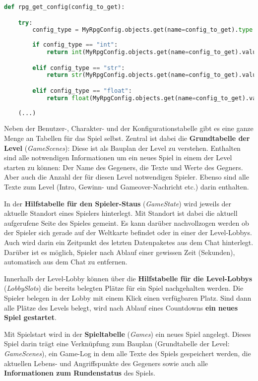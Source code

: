 \begin{lstlisting}[language=python]
def rpg_get_config(config_to_get):

    try: 
        config_type = MyRpgConfig.objects.get(name=config_to_get).type
    
        if config_type == "int":
            return int(MyRpgConfig.objects.get(name=config_to_get).value)

        elif config_type == "str":
            return str(MyRpgConfig.objects.get(name=config_to_get).value)

        elif config_type == "float":
            return float(MyRpgConfig.objects.get(name=config_to_get).value)
    
    (...)
\end{lstlisting}


Neben der Benutzer-, Charakter- und der Konfigurationstabelle gibt es eine ganze Menge an Tabellen für das Spiel selbst. Zentral ist dabei die \textbf{Grundtabelle der Level} (\textit{GameScenes}): Diese ist als Bauplan der Level zu verstehen. Enthalten sind alle notwendigen Informationen um ein neues Spiel in einem der Level starten zu können: Der Name des Gegeners, die Texte und Werte des Gegners. Aber auch die Anzahl der für diesen Level notwendigen Spieler. Ebenso sind alle Texte zum Level (Intro, Gewinn- und Gameover-Nachricht etc.) darin enthalten. 

In der \textbf{Hilfstabelle für den Spieler-Staus} (\textit{GameState}) wird jeweils der aktuelle Standort eines Spielers hinterlegt. Mit Standort ist dabei die aktuell aufgerufene Seite des Spieles gemeint. Es kann darüber nachvollzogen werden ob der Spieler sich gerade auf der Weltkarte befindet oder in einer der Level-Lobbys. Auch wird darin ein Zeitpunkt des letzten Datenpaketes aus dem Chat hinterlegt. Darüber ist es möglich, Spieler nach Ablauf einer gewissen Zeit (Sekunden), automatisch aus dem Chat zu entfernen. 

Innerhalb der Level-Lobby können über die \textbf{Hilfstabelle für die Level-Lobbys} (\textit{LobbySlots}) die bereits belegten Plätze für ein Spiel nachgehalten werden. Die Spieler belegen in der Lobby mit einem Klick einen verfügbaren Platz. Sind dann alle Plätze des Levels belegt, wird nach Ablauf eines Countdowns \textbf{ein neues Spiel gestartet}.

Mit Spielstart wird in der \textbf{Spieltabelle} (\textit{Games}) ein neues Spiel angelegt. Dieses Spiel darin trägt eine Verknüpfung zum Bauplan (Grundtabelle der Level: \textit{GameScenes}), ein Game-Log in dem alle Texte des Spiels gespeichert werden, die aktuellen Lebens- und Angriffspunkte des Gegeners sowie auch alle \textbf{Informationen zum Rundenstatus} des Spiels.

